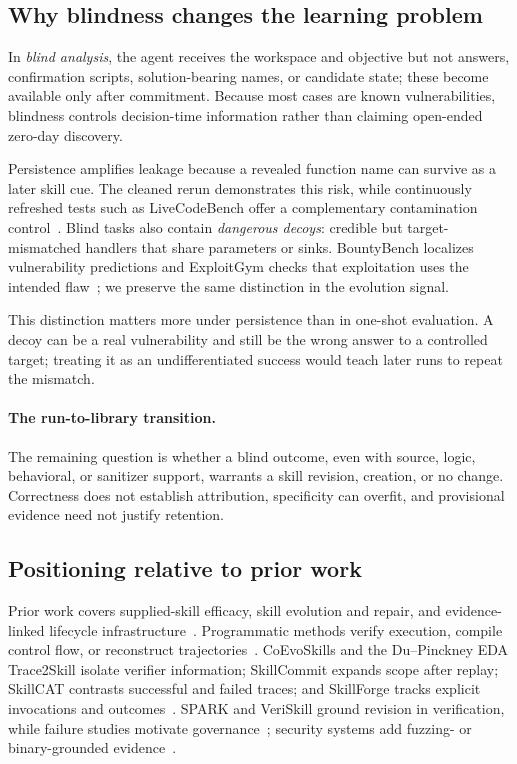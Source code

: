 \documentclass[11pt]{article}
\begin{document}
\subsection{Why blindness changes the learning problem}

In \emph{blind analysis}, the agent receives the workspace and objective but not answers,
confirmation scripts, solution-bearing names, or candidate state; these become available
only after commitment.  Because most cases are known vulnerabilities, blindness controls
decision-time information rather than claiming open-ended zero-day discovery.

Persistence amplifies leakage because a revealed function name can survive as a later
skill cue.  The cleaned rerun demonstrates this risk, while continuously refreshed tests
such as LiveCodeBench offer a complementary contamination control~\cite{livecodebench}.
Blind tasks also contain \emph{dangerous decoys}: credible but target-mismatched handlers
that share parameters or sinks.  BountyBench localizes vulnerability predictions and
ExploitGym checks that exploitation uses the intended flaw~\cite{bountybench,exploitgym};
we preserve the same distinction in the evolution signal.

This distinction matters more under persistence than in one-shot evaluation.  A decoy can
be a real vulnerability and still be the wrong answer to a controlled target; treating it
as an undifferentiated success would teach later runs to repeat the mismatch.

\paragraph{The run-to-library transition.}

The remaining question is whether a blind outcome, even with source, logic, behavioral,
or sanitizer support, warrants a skill revision, creation, or no change.  Correctness
does not establish attribution, specificity can overfit, and provisional evidence need
not justify retention.

\subsection{Positioning relative to prior work}

Prior work covers supplied-skill efficacy, skill evolution and repair, and
evidence-linked lifecycle infrastructure~\cite{skillsbench,skillevolbench,skillflow,
skillrevise,skillwiki,dynamicskills}.  Programmatic methods verify execution, compile
control flow, or reconstruct trajectories~\cite{asi,skilldisco,mindskill}.  CoEvoSkills
and the Du--Pinckney EDA Trace2Skill isolate verifier information; SkillCommit expands
scope after replay; SkillCAT contrasts successful and failed traces; and SkillForge tracks
explicit invocations and outcomes~\cite{coevoskills,trace2skilleda,skillcommit,skillcat,
skillforge}.  SPARK and VeriSkill ground revision in verification, while failure studies
motivate governance~\cite{spark,veriskill,skillharmful,misevolution,harnesssafe}; security
systems add fuzzing- or binary-grounded evidence~\cite{fuzzingbrainv2,veritas}.
\end{document}
